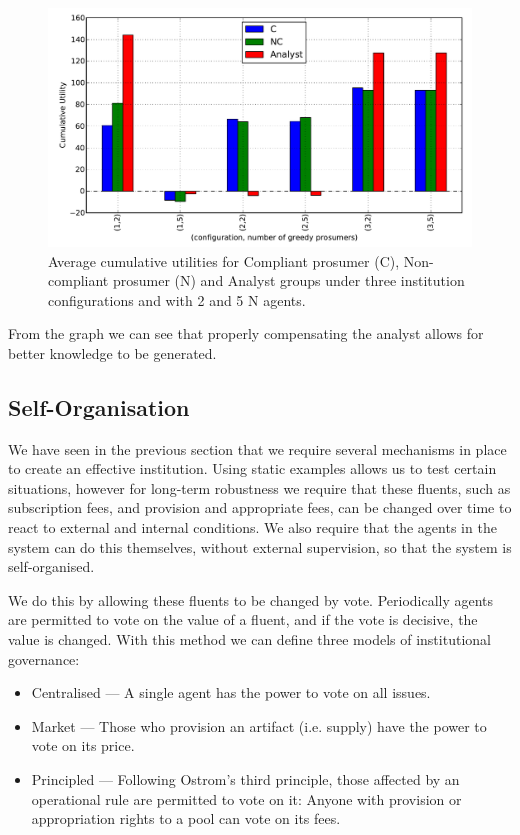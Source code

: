 \begin{figure}
\includegraphics[width=\linewidth]{gfx/kc/measuringCost1.pdf} 
\caption{Average cumulative utilities for Compliant prosumer (C), Non-compliant prosumer (N) and Analyst groups under three institution configurations and with 2 and 5 N agents.}\label{fig:measuringCost}
\end{figure}

From the graph we can see that properly compensating the analyst allows for better knowledge to be generated.

\subsection{Self-Organisation}

We have seen in the previous section that we require several mechanisms in place to create an effective institution. Using static examples allows us to test certain situations, however for long-term robustness we require that these fluents, such as subscription fees, and provision and appropriate fees, can be changed over time to react to external and internal conditions. We also require that the agents in the system can do this themselves, without external supervision, so that the system is self-organised.

We do this by allowing these fluents to be changed by vote. Periodically agents are permitted to vote on the value of a fluent, and if the vote is decisive, the value is changed. With this method we can define three models of institutional governance:
\begin{itemize}
\item Centralised --- A single agent has the power to vote on all issues.
\item Market --- Those who provision an artifact (i.e. supply) have the power to vote on its price.
\item Principled --- Following Ostrom's third principle, those affected by an operational rule are permitted to vote on it: Anyone with provision or appropriation rights to a pool can vote on its fees.
\end{itemize}

